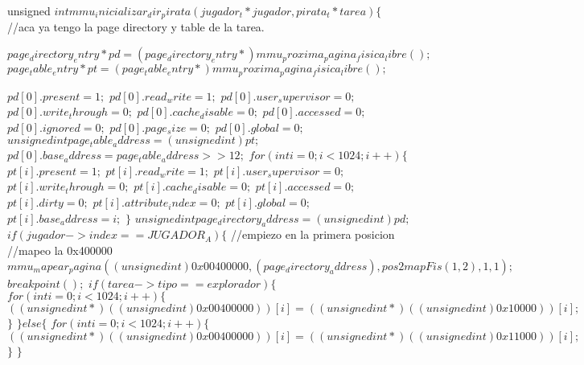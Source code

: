 \begin{algorithmic}
\State \tab unsigned $ int mmu_inicializar_dir_pirata(jugador_t* jugador, pirata_t* tarea) \{$
  //aca ya tengo la page directory y table de la tarea.

\State \tab \tab  $ page_directory_entry* pd = (page_directory_entry*) mmu_proxima_pagina_fisica_libre();$
\State \tab \tab  $ page_table_entry* pt = (page_table_entry*) mmu_proxima_pagina_fisica_libre();$

\State \tab \tab  $ pd[0].present = 1;$
\State \tab \tab  $ pd[0].read_write = 1;$
\State \tab \tab  $ pd[0].user_supervisor = 0;$
\State \tab \tab  $ pd[0].write_through = 0;$
\State \tab \tab  $ pd[0].cache_disable = 0;$
\State \tab \tab  $ pd[0].accessed = 0;$
\State \tab \tab  $ pd[0].ignored = 0;$
\State \tab \tab  $ pd[0].page_size = 0;$
\State \tab \tab  $ pd[0].global = 0;$
\State \tab \tab  $ unsigned int page_table_address = (unsigned int)pt;$
\State \tab \tab  $ pd[0].base_address = page_table_address >> 12;$
\State \tab \tab  $ for (int i = 0; i < 1024; i++) \{$
 \State \tab \tab \tab $    pt[i].present = 1;$
 \State \tab \tab \tab $    pt[i].read_write = 1;$
 \State \tab \tab \tab $    pt[i].user_supervisor = 0;$
 \State \tab \tab \tab $    pt[i].write_through = 0;$
 \State \tab \tab \tab $    pt[i].cache_disable = 0;$
 \State \tab \tab \tab $    pt[i].accessed = 0;$
 \State \tab \tab \tab $    pt[i].dirty = 0;$
 \State \tab \tab \tab $    pt[i].attribute_index = 0;$
 \State \tab \tab \tab $    pt[i].global = 0;$
 \State \tab \tab \tab $   pt[i].base_address = i;$
\State \tab \tab $  \}$
\State \tab \tab  $ unsigned int page_directory_address = (unsigned int)pd;$
\State \tab \tab  $ if (jugador->index == JUGADOR_A) \{$
    //empiezo en la primera posicion
    //mapeo la 0x400000
  \State \tab \tab \tab $   mmu_mapear_pagina((unsigned int)0x00400000, (page_directory_address), pos2mapFis(1,2), 1, 1);$
  \State \tab \tab \tab $   breakpoint();$
  \State \tab \tab \tab $   if (tarea->tipo == explorador) \{$
      \State \tab \tab \tab \tab $ for (int i = 0; i < 1024; i++) \{$
        \State \tab \tab \tab \tab \tab $ ((unsigned int*)((unsigned int)0x00400000))[i] = ((unsigned int*)((unsigned int)0x10000))[i];$
      \State \tab \tab \tab \tab $ \}$
   \State \tab \tab \tab $  \} else \{$
      \State \tab \tab \tab \tab $ for (int i = 0; i < 1024; i++) \{$
        \State \tab \tab \tab \tab \tab $ ((unsigned int*)((unsigned int)0x00400000))[i] = ((unsigned int*)((unsigned int)0x11000))[i];$
      \State \tab \tab \tab \tab $ \}$
       \State \tab \tab \tab $ \} $

\end{algorithmic}

